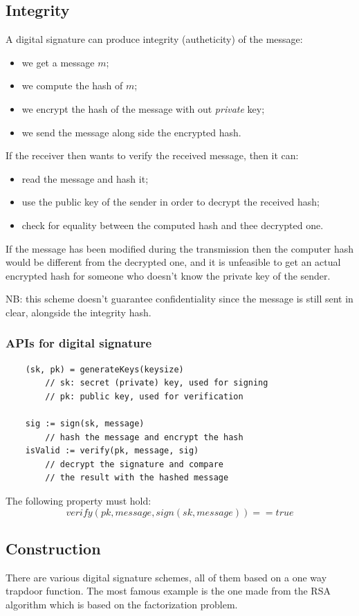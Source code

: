 \subsection{Integrity}
A digital signature can produce integrity (autheticity) of the message:
\begin{itemize}
    \item we get a message $m$;
    \item we compute the hash of $m$;
    \item we encrypt the hash of the message with out \emph{private} key;
    \item we send the message along side the encrypted hash.
\end{itemize}
If the receiver then wants to verify the received message, then it can:
\begin{itemize}
    \item read the message and hash it;
    \item use the public key of the sender in order to decrypt the received hash;
    \item check for equality between the computed hash and thee decrypted one.
\end{itemize}
If the message has been modified during the transmission then the computer hash would be different from the decrypted one, and it is unfeasible to get an actual encrypted hash for someone who doesn't know the private key of the sender.

NB: this scheme doesn't guarantee confidentiality since the message is still sent in clear, alongside the integrity hash.

\subsubsection{APIs for digital signature}
\begin{verbatim}
    (sk, pk) = generateKeys(keysize)
        // sk: secret (private) key, used for signing
        // pk: public key, used for verification

    sig := sign(sk, message)
        // hash the message and encrypt the hash
    isValid := verify(pk, message, sig)
        // decrypt the signature and compare
        // the result with the hashed message
\end{verbatim}
The following property must hold:
$$
    verify(pk, message, sign(sk, message)) == true
$$

\subsection{Construction}
There are various digital signature schemes, all of them based on a one way trapdoor function.
The most famous example is the one made from the RSA algorithm which is based on the factorization problem.

